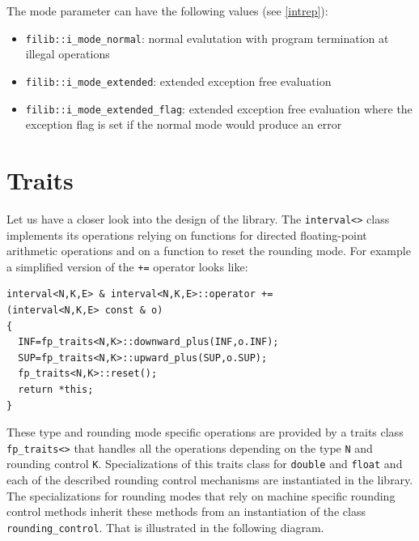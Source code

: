 \documentclass{report}
\begin{document}
The mode parameter can have the following values (see \ref{intrep}):

\begin{itemize}
\item[] \texttt{filib::i\_mode\_normal}: normal evalutation with program termination
at illegal operations
\item[] \texttt{filib::i\_mode\_extended}: extended exception free evaluation
\item[] \texttt{filib::i\_mode\_extended\_flag}: extended exception free evaluation where
the exception flag is set if the normal mode would produce an error
\end{itemize}

\section{Traits}

Let us have a closer look into the design of the library.  The
\texttt{interval<>} class  implements its operations relying on functions for
directed floating-point arithmetic operations and on a function to reset the
rounding mode. For example a simplified version of the \texttt{+=}
operator looks like:

\begin{verbatim}
interval<N,K,E> & interval<N,K,E>::operator +=
(interval<N,K,E> const & o)
{
  INF=fp_traits<N,K>::downward_plus(INF,o.INF);
  SUP=fp_traits<N,K>::upward_plus(SUP,o.SUP);
  fp_traits<N,K>::reset();
  return *this;
}
\end{verbatim}


 These type and rounding mode specific  operations are provided by a traits class
\texttt{fp\_traits<>} that handles all the operations depending on the type \texttt{N} and
rounding control \texttt{K}. Specializations of this traits class for \texttt{double} and
\texttt{float} and each of the described rounding control mechanisms
   are instantiated in the library. The specializations for rounding modes that
rely on machine specific rounding control methods inherit these methods from an
instantiation of the class \texttt{rounding\_control}. That is illustrated in the
following diagram.
\end{document}

